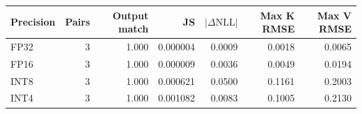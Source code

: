 \begin{tabular}{lrrrrrr}
\toprule
Precision & Pairs & Output match & JS & $|\Delta\mathrm{NLL}|$ & Max K RMSE & Max V RMSE \\
\midrule
FP32 & 3 & 1.000 & 0.000004 & 0.0009 & 0.0018 & 0.0065 \\
FP16 & 3 & 1.000 & 0.000009 & 0.0036 & 0.0049 & 0.0194 \\
INT8 & 3 & 1.000 & 0.000621 & 0.0500 & 0.1161 & 0.2003 \\
INT4 & 3 & 1.000 & 0.001082 & 0.0083 & 0.1005 & 0.2130 \\
\bottomrule
\end{tabular}
